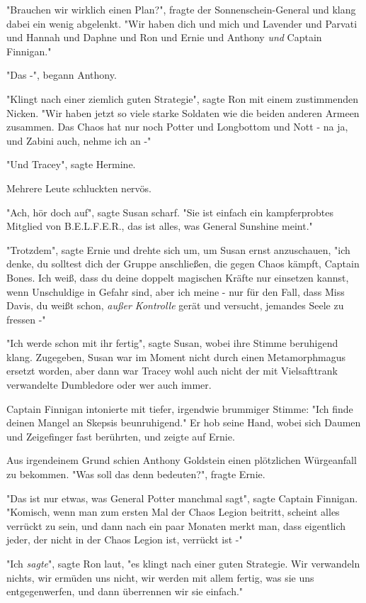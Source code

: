 {"Brauchen wir wirklich einen Plan?", fragte der Sonnenschein-General und klang dabei ein wenig abgelenkt. "Wir haben dich und mich und Lavender und Parvati und Hannah und Daphne und Ron und Ernie und Anthony \emph{und} Captain Finnigan."

"Das -", begann Anthony.

"Klingt nach einer ziemlich guten Strategie", sagte Ron mit einem zustimmenden Nicken. "Wir haben jetzt so viele starke Soldaten wie die beiden anderen Armeen zusammen. Das Chaos hat nur noch Potter und Longbottom und Nott - na ja, und Zabini auch, nehme ich an -"

"Und Tracey", sagte Hermine.

Mehrere Leute schluckten nervös.

"Ach, hör doch auf", sagte Susan scharf. "Sie ist einfach ein kampferprobtes Mitglied von B.E.L.F.E.R., das ist alles, was General Sunshine meint."

"Trotzdem", sagte Ernie und drehte sich um, um Susan ernst anzuschauen, "ich denke, du solltest dich der Gruppe anschließen, die gegen Chaos kämpft, Captain Bones. Ich weiß, dass du deine doppelt magischen Kräfte nur einsetzen kannst, wenn Unschuldige in Gefahr sind, aber ich meine - nur für den Fall, dass Miss Davis, du weißt schon, \emph{außer Kontrolle} gerät und versucht, jemandes Seele zu fressen -"

"Ich werde schon mit ihr fertig", sagte Susan, wobei ihre Stimme beruhigend klang. Zugegeben, Susan war im Moment nicht durch einen Metamorphmagus ersetzt worden, aber dann war Tracey wohl auch nicht der mit Vielsafttrank verwandelte Dumbledore oder wer auch immer.

Captain Finnigan intonierte mit tiefer, irgendwie brummiger Stimme: "Ich finde deinen Mangel an Skepsis beunruhigend." Er hob seine Hand, wobei sich Daumen und Zeigefinger fast berührten, und zeigte auf Ernie.

Aus irgendeinem Grund schien Anthony Goldstein einen plötzlichen Würgeanfall zu bekommen. "Was soll das denn bedeuten?", fragte Ernie.

"Das ist nur etwas, was General Potter manchmal sagt", sagte Captain Finnigan. "Komisch, wenn man zum ersten Mal der Chaos Legion beitritt, scheint alles verrückt zu sein, und dann nach ein paar Monaten merkt man, dass eigentlich jeder, der nicht in der Chaos Legion ist, verrückt ist -"

"Ich \emph{sagte}", sagte Ron laut, "es klingt nach einer guten Strategie. Wir verwandeln nichts, wir ermüden uns nicht, wir werden mit allem fertig, was sie uns entgegenwerfen, und dann überrennen wir sie einfach."

}
